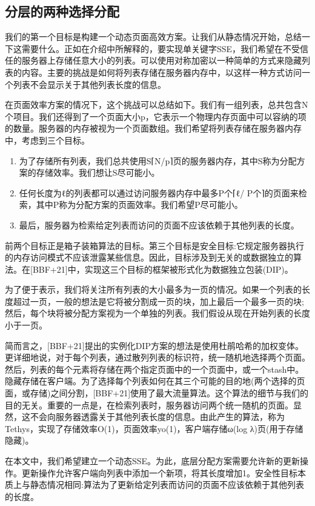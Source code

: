 \documentclass[UTF8]{article}
\begin{document}
\subsection{分层的两种选择分配}
我们的第一个目标是构建一个动态页面高效方案。让我们从静态情况开始，总结一下这需要什么。正如在介绍中所解释的，要实现单关键字SSE，我们希望在不受信任的服务器上存储任意大小的列表。可以使用对称加密以一种简单的方式来隐藏列表的内容。主要的挑战是如何将列表存储在服务器内存中，以这样一种方式访问一个列表不会显示关于其他列表长度的信息。

在页面效率方案的情况下，这个挑战可以总结如下。我们有一组列表，总共包含N个项目。我们还得到了一个页面大小p，它表示一个物理内存页面中可以容纳的项的数量。服务器的内存被视为一个页面数组。我们希望将列表存储在服务器内存中，考虑到三个目标。

\begin{enumerate}
  \item 为了存储所有列表，我们总共使用S⌈N/p⌉页的服务器内存，其中S称为分配方案的存储效率。我们想让S尽可能小。
  \item 任何长度为ℓ的列表都可以通过访问服务器内存中最多P个⌈ℓ/ P个⌉的页面来检索，其中P称为分配方案的页面效率。我们希望P尽可能小。
  \item 最后，服务器为检索给定列表而访问的页面不应该依赖于其他列表的长度。
\end{enumerate}

前两个目标正是箱子装箱算法的目标。第三个目标是安全目标:它规定服务器执行的内存访问模式不应该泄露某些信息。因此，目标涉及到无关的或数据独立的算法。在[BBF+21]中，实现这三个目标的框架被形式化为数据独立包装(DIP)。

为了便于表示，我们将关注所有列表的大小最多为一页的情况。如果一个列表的长度超过一页，一般的想法是它将被分割成一页的块，加上最后一个最多一页的块;然后，每个块将被分配方案视为一个单独的列表。我们假设从现在开始列表的长度小于一页。

简而言之，[BBF+21]提出的实例化DIP方案的想法是使用杜鹃哈希的加权变体。更详细地说，对于每个列表，通过散列列表的标识符，统一随机地选择两个页面。然后，列表的每个元素将存储在两个指定页面中的一个页面中，或一个stash中。隐藏存储在客户端。为了选择每个列表如何在其三个可能的目的地(两个选择的页面，或存储)之间分割，[BBF+21]使用了最大流量算法。这个算法的细节与我们的目的无关。重要的一点是，在检索列表时，服务器访问两个统一随机的页面。显然，这不会向服务器透露关于其他列表长度的信息。由此产生的算法，称为Tethys，实现了存储效率O(1)，页面效率yo(1)，客户端存储ω(log λ)页(用于存储隐藏)。

在本文中，我们希望建立一个动态SSE。为此，底层分配方案需要允许新的更新操作。更新操作允许客户端向列表中添加一个新项，将其长度增加1。安全性目标本质上与静态情况相同:算法为了更新给定列表而访问的页面不应该依赖于其他列表的长度。
\end{document}
